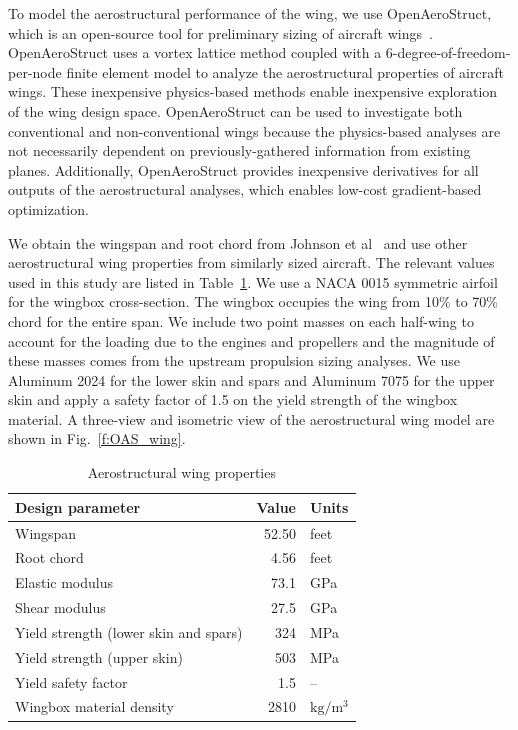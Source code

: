 
To model the aerostructural performance of the wing, we use OpenAeroStruct, which is an open-source tool for preliminary sizing of aircraft wings~\cite{Jasa2018a}.
OpenAeroStruct uses a vortex lattice method coupled with a 6-degree-of-freedom-per-node finite element model to analyze the aerostructural properties of aircraft wings.
These inexpensive physics-based methods enable inexpensive exploration of the wing design space.
OpenAeroStruct can be used to investigate both conventional and non-conventional wings because the physics-based analyses are not necessarily dependent on previously-gathered information from existing planes.
Additionally, OpenAeroStruct provides inexpensive derivatives for all outputs of the aerostructural analyses, which enables low-cost gradient-based optimization.

We obtain the wingspan and root chord from Johnson et al~\cite{johnson2018concept} and use other aerostructural wing properties from similarly sized aircraft.
The relevant values used in this study are listed in Table~\ref{t:aerostruct_wing}.
We use a NACA 0015 symmetric airfoil for the wingbox cross-section.
The wingbox occupies the wing from 10\% to 70\% chord for the entire span.
We include two point masses on each half-wing to account for the loading due to the engines and propellers and the magnitude of these masses comes from the upstream propulsion sizing analyses.
We use Aluminum 2024 for the lower skin and spars and Aluminum 7075 for the upper skin and apply a safety factor of 1.5 on the yield strength of the wingbox material.
A three-view and isometric view of the aerostructural wing model are shown in Fig.~\ref{f:OAS_wing}.

\begin{table}[!htb]
 \normalsize
 \begin{center}
  \caption{Aerostructural wing properties}
  \label{t:aerostruct_wing}
    \begin{tabular}{ l r l }
        \hline
        \textbf{Design parameter} & \textbf{Value} & \textbf{Units} \\
        \hline
        Wingspan & 52.50 & feet \\
        Root chord & 4.56 & feet \\
        Elastic modulus & 73.1 & GPa \\
        Shear modulus & 27.5 & GPa \\
        Yield strength (lower skin and spars) & 324 & MPa \\
        Yield strength (upper skin) & 503 & MPa \\
        Yield safety factor & 1.5 & -- \\
        Wingbox material density & 2810 & $\text{kg}/\text{m}^3$ \\
        \hline
    \end{tabular}
 \end{center}
\end{table}

